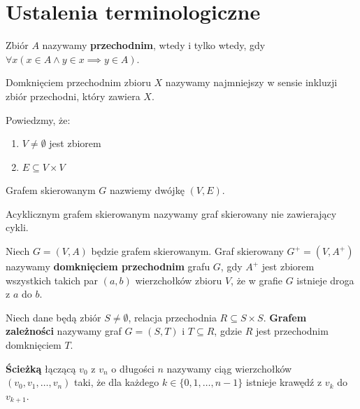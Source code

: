 \section{Ustalenia terminologiczne}
\begin{definicja}\label{def:transitive_set}
Zbiór \(A\) nazywamy \textbf{przechodnim}, wtedy i tylko wtedy, gdy
\(\forall{x}\left(x\in A \land y\in x\implies y\in A\right)\).  
\end{definicja}

\begin{definicja}\label{def:transitive_closure_set}
Domknięciem przechodnim zbioru \(X\) nazywamy najmniejszy w sensie inkluzji zbiór przechodni, który zawiera \(X\).
\end{definicja}

\begin{definicja}\label{def:DG}
Powiedzmy, że:
\begin{enumerate}
\item \(V\neq\emptyset\) jest zbiorem
\item \( E \subseteq V \times V \)
\end{enumerate}
Grafem skierowanym \(G\) nazwiemy dwójkę \((V, E)\).
\end{definicja}

\begin{definicja}\label{def:dag}
Acyklicznym grafem skierowanym nazywamy graf skierowany nie zawierający cykli.
\end{definicja}

\begin{definicja}\label{def:domk_przechodnie_grafu}
Niech \(G=(V,A)\) będzie grafem skierowanym. Graf skierowany \(G^+=(V,A^{+})\) nazywamy \textbf{domknięciem przechodnim} grafu \(G\), gdy \(A^{+}\) jest zbiorem wszystkich takich par \((a,b)\) wierzchołków zbioru \(V\), że w grafie \(G\) istnieje droga z \(a\) do \(b\).
\end{definicja}

\begin{definicja}\label{def:depend_graph}
Niech dane będą zbiór \(S\neq\emptyset\), relacja przechodnia \(R\subseteq S\times S\). \textbf{Grafem zależności} nazywamy graf \(G=(S,T)\) i \(T\subseteq R\), gdzie \(R\) jest przechodnim domknięciem \(T\).
\end{definicja}


\begin{definicja}[Ścieżka]\label{def:sciezka}
\textbf{Ścieżką} łączącą \(v_0\) z \(v_n\) o długości \(n\) nazywamy ciąg wierzchołków \((v_0, v_1, \dots, v_n)\) taki, że dla każdego \(k\in \{0, 1, \dots, n-1\}\) istnieje krawędź z \(v_k\) do \(v_{k+1}\).
\end{definicja}

